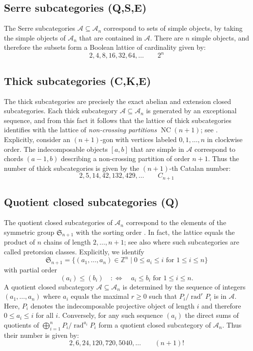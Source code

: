 \documentclass[a4paper]{amsart}
\theoremstyle{plain}
\theoremstyle{definition}
\theoremstyle{remark}
\numberwithin{equation}{section}
\newcommand{\NC}{\operatorname{NC}}
\newcommand{\rad}{\operatorname{rad}}
\def\A{\mathcal A}
\def\bbZ{\mathbb Z}
\begin{document}
\subsection*{Serre subcategories (Q,S,E)}
The Serre subcategories $\A\subseteq \A_n$ correspond to sets of simple
objects, by taking the simple objects of $\A_n$ that are contained in $\A$.
There are $n$ simple objects, and therefore the subsets form a
Boolean lattice of cardinality given by: \[2,4,8,16,32,64,\ldots \qquad 2^n\tag*{$\#(Q,S,E)$}\]

\subsection*{Thick subcategories (C,K,E)}
The thick subcategories are precisely the exact abelian and extension
closed subcategories.  Each thick subcategory $\A\subseteq \A_n$ is
generated by an exceptional sequence, and from this fact it follows
that the lattice of thick subcategories identifies with the lattice of
\emph{non-crossing partitions} $\NC(n+1)$; see
\cite{IT2009}. Explicitly, consider an $(n+1)$-gon with vertices
labeled $0,1,\ldots,n$ in clockwise order. The indecomposable objects $[a,b]$
that are simple in $\A$ correspond to chords $(a-1,b)$ describing a
non-crossing partition of order $n+1$.  Thus the number of thick
subcategories is given by the $(n+1)$-th Catalan number:
\[2, 5, 14, 42, 132, 429,\ldots \qquad C_{n+1}\tag*{$\#(C,K,E)$}\]

\subsection*{Quotient closed subcategories (Q)}

The quotient closed subcategories of $\A_n$ correspond to the elements
of the symmetric group $\mathfrak S_{n+1}$ with the sorting order
\cite{Ar2009,ORT2015}. In fact, the lattice equals the product of $n$
chains of length $2,\ldots ,n+1$; see also \cite{CFY2025} where such
subcategories are called pretorsion classes. Explicitly, we
identify
\[\mathfrak S_{n+1}=\{(a_1,\ldots,a_n)\in\bbZ^n\mid  0\le a_i\le
  i\text{ for }1\le i\le n\}\]
with partial order
\[ (a_i)\le (b_i)\quad :\iff\quad a_i\le b_i \text{ for }1\le i\le
  n.\] A quotient closed subcategory $\A\subseteq\A_n$ is determined
by the sequence of integers $(a_1,\ldots,a_n)$ where $a_i$ equals the
maximal $r\ge 0$ such that $P_i/\rad^r P_i$ is in $\A$. Here, $P_i$
denotes the indecomposable projective object of length $i$ and
therefore $0\le a_i\le i$ for all $i$. Conversely, for any such
sequence $(a_i)$ the direct sums of quotients of
$\bigoplus_{i=1}^n P_i/\rad^{a_i} P_i$ form a quotient closed
subcategory of $\A_n$.  Thus their number is given by:
\[2, 6, 24, 120, 720, 5040,\ldots \qquad (n+1)! \tag*{$\#(Q)$}\]
\end{document}
